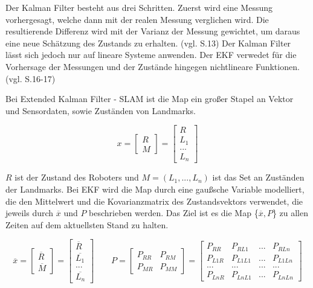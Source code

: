 Der Kalman Filter besteht aus drei Schritten. Zuerst wird eine Messung vorhergesagt, welche dann mit der realen Messung verglichen wird. Die resultierende Differenz wird mit der Varianz der Messung gewichtet, um daraus eine neue Schätzung des Zustands zu erhalten. (vgl. \cite{slam_studi} S.13) Der Kalman Filter lässt sich jedoch nur auf lineare Systeme anwenden. Der EKF verwedet für die Vorhersage der Messungen und der Zustände hingegen nichtlineare Funktionen. (vgl. \cite{slam_studi} S.16-17)

Bei Extended Kalman Filter - SLAM ist die Map ein großer Stapel an Vektor und Sensordaten, sowie Zuständen von Landmarks.

\begin{equation}
  x =  \begin{bmatrix}
		R\\
		M
     	\end{bmatrix}
     = \begin{bmatrix}
		R\\
		L_1\\
		...\\
		L_n
     	\end{bmatrix}
\end{equation}

\( R\) ist der Zustand des Roboters und \( M = (L_1, ..., L_n)\)  ist das Set an Zuständen der Landmarks.
Bei EKF wird die Map durch eine gaußsche Variable modelliert, die den Mittelwert und die Kovarianzmatrix des Zustandsvektors verwendet, die jeweils durch \(\overline{x}\) und \(P\) beschrieben werden. Das Ziel ist es die Map \{\(\overline{x}, P\)\} zu allen Zeiten auf dem aktuellsten Stand zu halten.


\begin{equation}
  \overline{x} =  
  		\begin{bmatrix}
		\overline{R}\\
		\overline{M}
     	\end{bmatrix}
     = 
     	\begin{bmatrix}
		\overline{R}\\
		\overline{L_1}\\
		...\\
		\overline{L_n}
     	\end{bmatrix}
     	\quad\quad
     P = 
     	\begin{bmatrix}
		P_{RR} & P_{RM}\\
		P_{MR} & P_{MM}
     	\end{bmatrix}
     = 
     	\begin{bmatrix}
		P_{RR} & P_{RL1} & ... & P_{RLn}\\
		P_{L1R} & P_{L1L1} & ... & P_{L1Ln}\\
		... & ... & ... & ... \\
		P_{LnR} & P_{LnL1} & ... & P_{LnLn}
     	\end{bmatrix}
\end{equation}

